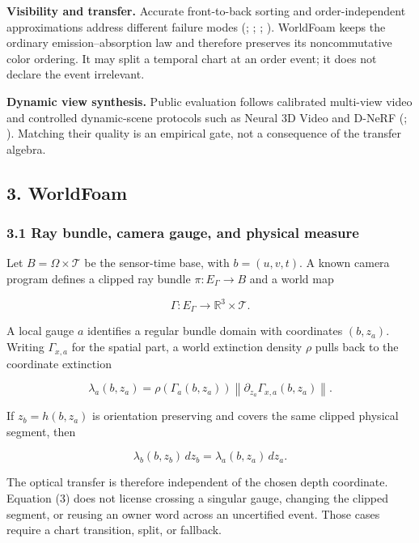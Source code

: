 \documentclass[
]{article}
\begin{document}
\textbf{Visibility and transfer.} Accurate front-to-back sorting and
order-independent approximations address different failure modes
(;
;
;
). WorldFoam keeps the
ordinary emission--absorption law and therefore preserves its
noncommutative color ordering. It may split a temporal chart at an order
event; it does not declare the event irrelevant.

\textbf{Dynamic view synthesis.} Public evaluation follows calibrated
multi-view video and controlled dynamic-scene protocols such as Neural
3D Video and D-NeRF (; ).
Matching their quality is an empirical gate, not a consequence of the
transfer algebra.

\subsection{3. WorldFoam}\label{worldfoam}

\subsubsection{3.1 Ray bundle, camera gauge, and physical
measure}\label{ray-bundle-camera-gauge-and-physical-measure}

Let \(B=\Omega\times\mathcal T\) be the sensor-time base, with
\(b=(u,v,t)\). A known camera program defines a clipped ray bundle
\(\pi:E_\Gamma\rightarrow B\) and a world map

\[
\Gamma:E_\Gamma\rightarrow\mathbb R^3\times\mathcal T.
\tag{1}
\]

A local gauge \(a\) identifies a regular bundle domain with coordinates
\((b,z_a)\). Writing \(\Gamma_{x,a}\) for the spatial part, a world
extinction density \(\rho\) pulls back to the coordinate extinction

\[
\lambda_a(b,z_a)
=\rho\!\left(\Gamma_a(b,z_a)\right)
 \left\|\partial_{z_a}\Gamma_{x,a}(b,z_a)\right\|.
\tag{2}
\]

If \(z_b=h(b,z_a)\) is orientation preserving and covers the same
clipped physical segment, then

\[
\lambda_b(b,z_b)\,dz_b=\lambda_a(b,z_a)\,dz_a.
\tag{3}
\]

The optical transfer is therefore independent of the chosen depth
coordinate. Equation (3) does not license crossing a singular gauge,
changing the clipped segment, or reusing an owner word across an
uncertified event. Those cases require a chart transition, split, or
fallback.
\end{document}
